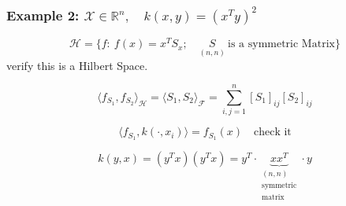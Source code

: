 \documentclass[10pt,portrait]{article}
\begin{document}
\hypertarget{example-2-mathcalxinmathbbrnquad-kxyxty2}{%
\subsubsection{\texorpdfstring{Example 2:
\(\mathcal{X}\in\mathbb{R}^n,\quad k(x,y)=(x^Ty)^2\)}{Example 2: \textbackslash{}mathcal\{X\}\textbackslash{}in\textbackslash{}mathbb\{R\}\^{}n,\textbackslash{}quad k(x,y)=(x\^{}Ty)\^{}2}}\label{example-2-mathcalxinmathbbrnquad-kxyxty2}}

\[\mathcal{H} = \{f:\ f(x)=x^TS_x;\quad \underset{{(n,n)}}{S}\ \text{is a symmetric Matrix}\}\]
verify this is a Hilbert Space.

\[\langle f_{S_1},f_{S_2}\rangle_{\mathcal{H}}=\langle S_1,S_2\rangle_{\mathcal{F}}=\sum\limits_{i,j=1}^n[S_1]_{ij}[S_2]_{ij}\]

\[ \langle f_{S_1},k(\cdot,x_i)\rangle = f_{S_1}(x)\quad \text{check it}\]

\[k(y,x)=(y^Tx)(y^Tx)=y^T\cdot \underbrace{xx^T}_{\substack{(n,n)\\ \text{symmetric}\\ \text{matrix}}}\cdot y\]
\end{document}
